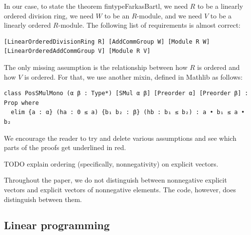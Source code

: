 \documentclass[]{article}
\renewcommand{\.}{\hskip .75pt}
\begin{document}
In our case, to state the theorem fintypeFarkasBartl,
we need $R$ to be a linearly ordered division ring,
we need $W$ to be an $R$-module, and
we need $V$ to be a linearly ordered $R$-module.
The following list of requirements is almost correct:
\begin{lstlisting}
[LinearOrderedDivisionRing R] [AddCommGroup W] [Module R W] [LinearOrderedAddCommGroup V] [Module R V]
\end{lstlisting}
The only missing assumption is the relationship between how $R$ is ordered and how $V$ is ordered.
For that, we use another mixin, defined in Mathlib as follows:
\begin{lstlisting}
class PosSMulMono (α β : Type*) [SMul α β] [Preorder α] [Preorder β] : Prop where
  elim {a : α} (ha : 0 ≤ a) {b₁ b₂ : β} (hb : b₁ ≤ b₂) : a • b₁ ≤ a • b₂
\end{lstlisting}
We encourage the reader to try and delete various assumptions and see which parts of the proofs
get underlined in red.

{\color{blue}
TODO explain ordering (specifically, nonnegativity) on explicit vectors.
}

Throughout the paper, we do not distinguish between
nonnegative explicit vectors and explicit vectors of nonnegative elements.
The code, however, does distinguish between them.


\subsection{Linear programming}
\end{document}
